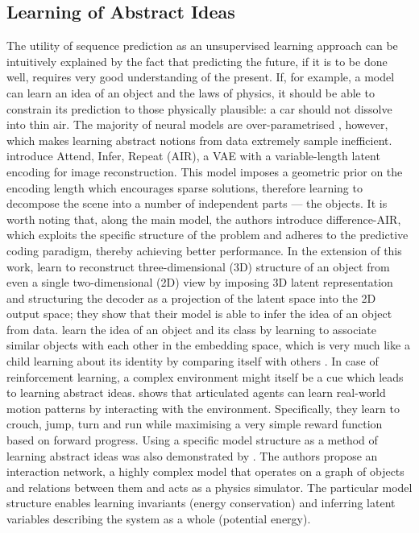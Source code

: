     \subsection{Learning of Abstract Ideas}
        The utility of sequence prediction as an unsupervised learning approach can be intuitively explained by the fact that predicting the future, if it is to be done well, requires very good understanding of the present. If, for example, a model can learn an idea of an object and the laws of physics, it should be able to constrain its prediction to those physically plausible: \eg a car should not dissolve into thin air. The majority of neural models are over-parametrised \citep{Denil2013}, however, which makes learning abstract notions from data extremely sample inefficient. \cite{Eslami2016} introduce Attend, Infer, Repeat (AIR), a VAE with a variable-length latent encoding for image reconstruction. This model imposes a geometric prior on the encoding length which encourages sparse solutions, therefore learning to decompose the scene into a number of independent parts --- the objects. It is worth noting that, along the main model, the authors introduce difference-AIR, which exploits the specific structure of the problem and adheres to the predictive coding paradigm, thereby achieving better performance. In the extension of this work, \cite{Rezende2016} learn to reconstruct three-dimensional (3D) structure of an object from even a single two-dimensional (2D) view by imposing 3D latent representation and structuring the decoder as a projection of the latent space into the 2D output space; they show that their model is able to infer the idea of an object from data.
        \cite{Haeusser2017} learn the idea of an object and its class by learning to associate similar objects with each other in the embedding space, which is very much like a child learning about its identity by comparing itself with others \citep{Decety2003}.
        In case of reinforcement learning, a complex environment might itself be a cue which leads to learning abstract ideas. \cite{Heess2017} shows that articulated agents can learn real-world motion patterns by interacting with the environment. Specifically, they learn to crouch, jump, turn and run while maximising a very simple reward function based on forward progress.
        Using a specific model structure as a method of learning abstract ideas was also demonstrated by \cite{Battaglia2016}. The authors propose an interaction network, a highly complex model that operates on a graph of objects and relations between them and acts as a physics simulator. The particular model structure enables learning invariants (\eg energy conservation) and inferring latent variables describing the system as a whole (\eg potential energy).
        
